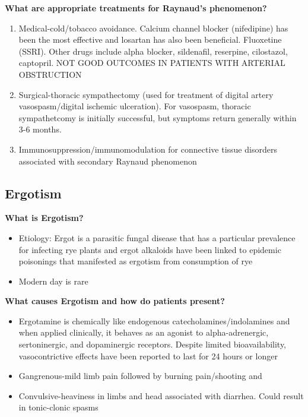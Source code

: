 \documentclass[
]{book}
\begin{document}
\textbf{What are appropriate treatments for Raynaud's phenomenon?}

\begin{enumerate}
\def\labelenumi{\arabic{enumi}.}
\item
  Medical-cold/tobacco avoidance. Calcium channel blocker (nifedipine)
  has been the most effective and losartan has also been beneficial.
  Fluoxetine (SSRI). Other drugs include alpha blocker, sildenafil,
  reserpine, cilostazol, captopril. NOT GOOD OUTCOMES IN PATIENTS WITH
  ARTERIAL OBSTRUCTION~
\item
  Surgical-thoracic sympathectomy (used for treatment of digital
  artery vasospasm/digital ischemic ulceration). For vasospasm,
  thoracic sympathetcomy is initially successful, but symptoms return
  generally within 3-6 months.~
\item
  Immunosuppression/immunomodulation for connective tissue disorders
  associated with secondary Raynaud phenomenon
\end{enumerate}

\hypertarget{ergotism}{%
\subsection{\texorpdfstring{\textbf{Ergotism}}{Ergotism}}\label{ergotism}}

\textbf{What is Ergotism?} \citet{jamescstanleyCurrentTherapyVascular2014}

\begin{itemize}
\item
  Etiology: Ergot is a parasitic fungal disease that has a particular
  prevalence for infecting rye plants and ergot alkaloids have been
  linked to epidemic poisonings that manifested as ergotism from
  consumption of rye~
\item
  Modern day is rare
\end{itemize}

\textbf{What causes Ergotism and how do patients present?}

\begin{itemize}
\item
  Ergotamine is chemically like endogenous catecholamines/indolamines
  and when applied clinically, it behaves as an agonist to
  alpha-adrenergic, sertoninergic, and dopaminergic receptors. Despite
  limited bioavailability, vasocontrictive effects have been reported
  to last for 24 hours or longer~
\item
  Gangrenous-mild limb pain followed by burning pain/shooting and~
\item
  Convulsive-heaviness in limbs and head associated with diarrhea.
  Could result in tonic-clonic spasms~
\end{itemize}
\end{document}
